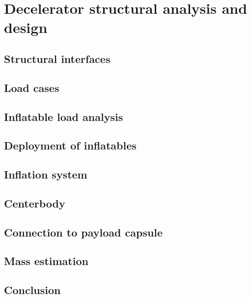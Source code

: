\section{Decelerator structural analysis and design}\label{cha:structures}

\subsection{Structural interfaces} \label{sec:struc_interfaces}


\subsection{Load cases} \label{sec:struc_loads}


\subsection{Inflatable load analysis} \label{sec:struc_InflatableLoad}


\subsection{Deployment of inflatables} \label{sec:struc_Deployment}


\subsection{Inflation system} \label{sec:struc_InflationSystem}


\subsection{Centerbody} \label{sec:struc_Centerbody}


\subsection{Connection to payload capsule} \label{sec:struc_Connection}


\subsection{Mass estimation} \label{sec:struc_Mass}


\subsection{Conclusion} \label{sec:struc_Conclusion}

